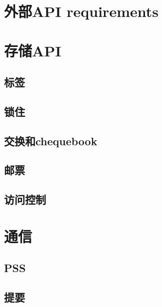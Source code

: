 \section{外部API requirements\statusorange}\label{spec:api:external}



\section{存储API \statusyellow}\label{spec:api:storage}



\subsection{标签\statusyellow}\label{spec:api:tags}


\subsection{锁住
\statusyellow}\label{spec:api:pinning}


\subsection{交换和chequebook\statusorange}\label{spec:api:swap}


\subsection{邮票\statusorange}\label{spec:api:postage}



\subsection{访问控制\statusgreen}\label{spec:api:access-control}




\section{通信\statusorange}\label{spec:api:communications}


\subsection{PSS \statusyellow}\label{spec:api:trojan}



\subsection{提要\statusorange}\label{spec:api:feeds}




